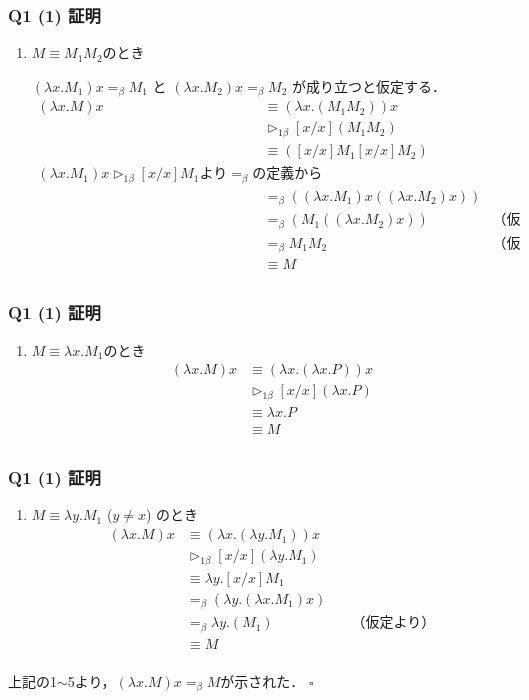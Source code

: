 \begin{frame}
    \frametitle{Q1 (1) 証明}
    \begin{enumerate}
        \item[3] $M \equiv M_1 M_2$のとき
        
        $(\lambda x.M_1)x =_{\beta} M_1$ と $(\lambda x.M_2)x =_{\beta} M_2$ 
        が成り立つと仮定する．
        \begin{align*}
        (\lambda x.M)x &\equiv (\lambda x.(M_1 M_2))x \\
        &\rhd_{1\beta} [x/x](M_1 M_2) \\
        &\equiv ([x/x]M_1 [x/x]M_2) \\
        (\lambda x.M_1)x \rhd_{1\beta} [x/x]M_1 \text{より}=_{\beta}\text{の定義から}\\
        &=_{\beta}((\lambda x.M_1)x ((\lambda x.M_2)x)) \\
        &=_{\beta} (M_1 ((\lambda x.M_2)x)) &\text{（仮定より）}\\
        &=_{\beta} M_1 M_2  &\text{（仮定より）}\\
        &\equiv M \\
        \end{align*}
    \end{enumerate}
\end{frame}

\begin{frame}
    \frametitle{Q1 (1) 証明}
    \begin{enumerate}
        \item[4] $M \equiv \lambda x.M_1$のとき
        \begin{align*}
            (\lambda x.M)x &\equiv (\lambda x.(\lambda x.P))x\\
            &\rhd_{1\beta} [x/x](\lambda x.P) \\
            &\equiv \lambda x.P \\
            &\equiv M \\
        \end{align*}
    \end{enumerate}
\end{frame}

\begin{frame}
    \frametitle{Q1 (1) 証明}
    \begin{enumerate}
        \item[5] $M \equiv \lambda y.M_1$ ($y \neq x$) のとき
        \begin{align*}
            (\lambda x.M)x &\equiv (\lambda x.(\lambda y.M_1))x \\
            &\rhd_{1\beta} [x/x](\lambda y.M_1) \\
            &\equiv \lambda y.[x/x]M_1 \\
            &=_{\beta} (\lambda y.(\lambda x.M_1)x) \\
            &=_{\beta} \lambda y.(M_1) &\quad\text{（仮定より）}\\
            &\equiv M \\
        \end{align*}
    \end{enumerate}
    上記の1$\sim$5より，$(\lambda x.M)x =_{\beta} M$が示された． $\square$
\end{frame}

